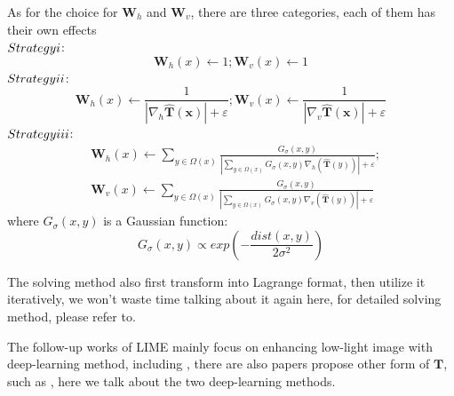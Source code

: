 \documentclass[10pt,twocolumn,letterpaper]{article}
\begin{document}
As for the choice for $\mathbf{W}_h$ and $\mathbf{W}_v$, there are three categories, each of them has their own effects \\
$Strategy \uppercase\expandafter{\romannumeral1}$:
\begin{equation}
    \mathbf{W}_h(x) \leftarrow 1; \mathbf{W}_v(x) \leftarrow 1
\end{equation}
$Strategy \uppercase\expandafter{\romannumeral2}$:
\begin{equation}
    \mathbf{W}_h(x) \leftarrow \frac{1}{|\nabla_h\mathbf{\hat{T}(x)}|+ \varepsilon}; \mathbf{W}_v(x) \leftarrow \frac{1}{|\nabla_v\mathbf{\hat{T}(x)}|+ \varepsilon}
\end{equation}
$Strategy \uppercase\expandafter{\romannumeral3}$:
\begin{align}
    &\mathbf{W}_h(x) \leftarrow \sum_{y \in \Omega(x)}\frac{G_\sigma(x,y)}{|\sum_{y \in \Omega(x)} G_\sigma(x,y)\nabla_h(\hat{\mathbf{T}}(y))|+\varepsilon}; \\
    &\mathbf{W}_v(x) \leftarrow \sum_{y \in \Omega(x)}\frac{G_\sigma(x,y)}{|\sum_{y \in \Omega(x)} G_\sigma(x,y)\nabla_v(\hat{\mathbf{T}}(y))|+\varepsilon}
\end{align}
where $G_\sigma(x,y)$ is a Gaussian function:
\begin{equation}
    G_\sigma(x,y) \propto exp(- \frac{dist(x,y)}{2\sigma^2})
\end{equation}

The solving method also first transform into Lagrange format, then utilize it iteratively, we won't waste time talking about it again here, for detailed solving method, please refer to\cite{guo2016lime}.

The follow-up works of LIME mainly focus on enhancing low-light image with deep-learning method, including \cite{zhang2019kindling,wang2019underexposed}, there are also papers propose other form of $ \mathbf{T}$, such as \cite{hao2018low}, here we talk about the two deep-learning methods.
\end{document}
